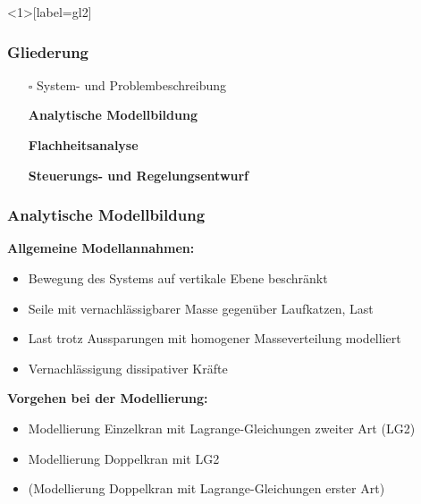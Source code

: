 \documentclass[
	ngerman,
	10pt,				%
	aspectratio=169 	%
]{beamer}
\newcommand{\cdbox}{$\square$\hspace{-0.65em}\raisebox{0.1em}{\checkmark}\hspace{-0.18em}}
\begin{document}

\begin{frame}<1>[label=gl2]
	\frametitle{Gliederung}
	\begin{itemize}
		\item[\cdbox] System- und Problembeschreibung
		\item[\only<1>{$\rightarrow$}\only<2>{$\rightarrow$}\only<3->{\cdbox}]
		\textbf<1>{Analytische Modellbildung}
		\item[\only<1>{$\square$}\only<2>{$\rightarrow$}\only<3->{\cdbox}]
		\textbf<2>{Flachheitsanalyse}
		\item[\only<1-2>{$\square$}\only<3>{$\rightarrow$}\only<4->{\cdbox}]
		\textbf<3>{Steuerungs- und Regelungsentwurf}
	\end{itemize}
\end{frame}


\begin{frame}[label=analMB]
	\frametitle{Analytische Modellbildung}
	\textbf{Allgemeine Modellannahmen:}
	\begin{itemize}
		\item Bewegung des Systems auf vertikale Ebene beschränkt
		\pause
		\item Seile mit vernachlässigbarer Masse gegenüber Laufkatzen, Last
		\pause
		\item Last trotz Aussparungen mit homogener Masseverteilung modelliert
		\pause
		\item Vernachlässigung dissipativer Kräfte 
	\end{itemize}

	\pause
	\bigskip
	\textbf{Vorgehen bei der Modellierung:}
	\begin{itemize}
		\item Modellierung Einzelkran mit Lagrange-Gleichungen zweiter Art (LG2)
		\pause
		\item Modellierung Doppelkran mit LG2
		\pause
		\item (Modellierung Doppelkran mit Lagrange-Gleichungen erster Art)
	\end{itemize}
\end{frame}

\end{document}
